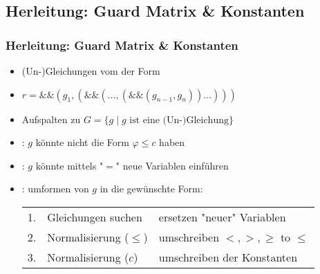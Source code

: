\subsection{Herleitung: Guard Matrix \& Konstanten}
\begin{frame}
	\frametitle{Herleitung: Guard Matrix \& Konstanten}
	\begin{itemize}
		\item (Un-)Gleichungen vom \seg der Form
		\item[] \hspace{1cm} $r = \&\&(g_1,( \&\& (\dots,(\&\&(g_{n-1},g_n) )\dots)))$
%	
	
		\item Aufspalten zu $G=\{g \mid g \text{ ist eine (Un-)Gleichung}\}$
		\item {}: $g$ k\"onnte nicht die Form $\varphi \le c$ haben
		\item {}: $g$ k\"onnte mittels "$=$" neue Variablen einf\"uhren
		\item {}: umformen von $g$ in die gew\"unschte Form: 
			\begin{tabular}{cll}
				1. & Gleichungen suchen   & ersetzen "neuer" Variablen \\
				2. & Normalisierung ($\le$) & umschreiben $<,>,\ge$ to $\le$ \\
				3. & Normalisierung ($c$)   & umschreiben der Konstanten\\
			\end{tabular}
	\end{itemize}	
\end{frame}

